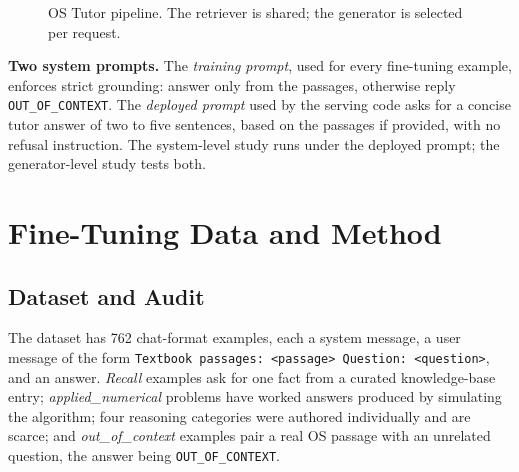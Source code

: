 \documentclass[conference]{IEEEtran}
\begin{document}
\begin{figure}[t]
\centering
{}
\caption{OS Tutor pipeline. The retriever is shared; the generator is selected per request.}
\label{fig:arch}
\end{figure}

\textbf{Two system prompts.} The \emph{training prompt}, used for every fine-tuning example, enforces strict grounding: answer only from the passages, otherwise reply \texttt{OUT\_OF\_CONTEXT}. The \emph{deployed prompt} used by the serving code asks for a concise tutor answer of two to five sentences, based on the passages if provided, with no refusal instruction. The system-level study runs under the deployed prompt; the generator-level study tests both.

\section{Fine-Tuning Data and Method}\label{sec:data}

\subsection{Dataset and Audit}\label{sec:audit}
The dataset has 762 chat-format examples, each a system message, a user message of the form \texttt{Textbook passages: <passage> Question: <question>}, and an answer. \emph{Recall} examples ask for one fact from a curated knowledge-base entry; \emph{applied\_numerical} problems have worked answers produced by simulating the algorithm; four reasoning categories were authored individually and are scarce; and \emph{out\_of\_context} examples pair a real OS passage with an unrelated question, the answer being \texttt{OUT\_OF\_CONTEXT}.
\end{document}
